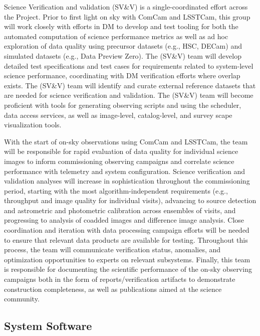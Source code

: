\documentclass[SE,lsstdraft,authoryear,toc]{lsstdoc}
\begin{document}
Science Verification and validation (SV\&V) is a single-coordinated effort across the Project.
Prior to first light on sky with ComCam and LSSTCam, this group will work closely with efforts in DM to develop and test tooling for both the automated computation of science performance metrics as well as ad hoc exploration of data quality using precursor datasets (e.g., HSC, DECam) and simulated datasets (e.g., Data Preview Zero).
The (SV\&V) team will develop detailed test specifications and test cases for requirements related to system-level science performance, coordinating with DM verification efforts where overlap exists.
The (SV\&V) team will identify and curate external reference datasets that are needed for science verification and validation.
The (SV\&V) team will become proficient with tools for generating observing scripts and using the scheduler, data access services, as well as image-level, catalog-level, and survey scape visualization tools.

With the start of on-sky observations using ComCam and LSSTCam, the team will be responsible for rapid evaluation of data quality for individual science images to inform commissioning observing campaigns and correlate science performance with telemetry and system configuration.
Science verification and validation analyses will increase in sophistication throughout the commissioning period, starting with the most algorithm-independent requirements (e.g., throughput and image quality for individual visits), advancing to source detection and astrometric and photometric calibration across ensembles of visits, and progressing to analysis of coadded images and difference image analysis.
Close coordination and iteration with data processing campaign efforts will be needed to ensure that relevant data products are available for testing.
Throughout this process, the team will communicate verification status, anomalies, and optimization opportunities to experts on relevant subsystems.
Finally, this team is responsible for documenting the scientific performance of the on-sky observing campaigns both in the form of reports/verification artifacts to demonstrate construction completeness, as well as publications aimed at the science community.

\subsection{System Software}
\end{document}
